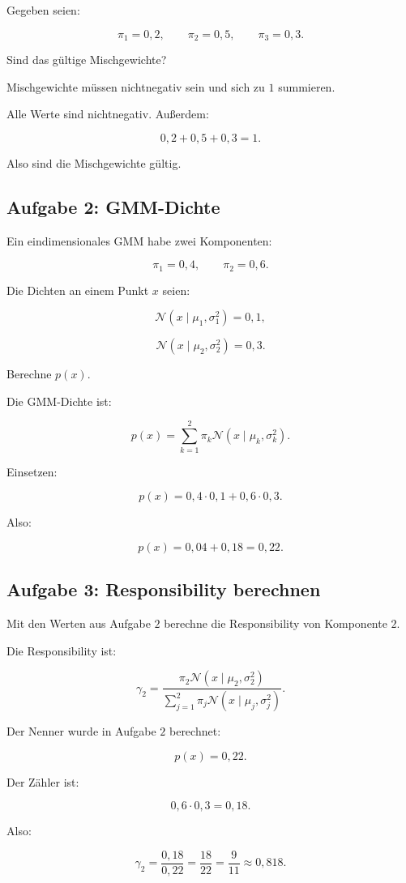 Gegeben seien:

\[
    \pi_1=0{,}2,
    \qquad
    \pi_2=0{,}5,
    \qquad
    \pi_3=0{,}3.
\]

Sind das gültige Mischgewichte?

\begin{examplebox}
Mischgewichte müssen nichtnegativ sein und sich zu \(1\) summieren.

Alle Werte sind nichtnegativ.
Außerdem:

\[
    0{,}2+0{,}5+0{,}3=1.
\]

Also sind die Mischgewichte gültig.
\end{examplebox}

\subsection{Aufgabe 2: GMM-Dichte}

Ein eindimensionales GMM habe zwei Komponenten:

\[
    \pi_1=0{,}4,
    \qquad
    \pi_2=0{,}6.
\]

Die Dichten an einem Punkt \(x\) seien:

\[
    \mathcal{N}(x\mid\mu_1,\sigma_1^2)=0{,}1,
\]

\[
    \mathcal{N}(x\mid\mu_2,\sigma_2^2)=0{,}3.
\]

Berechne \(p(x)\).

\begin{examplebox}
Die GMM-Dichte ist:

\[
    p(x)
    =
    \sum_{k=1}^{2}
    \pi_k
    \mathcal{N}(x\mid\mu_k,\sigma_k^2).
\]

Einsetzen:

\[
    p(x)
    =
    0{,}4\cdot 0{,}1
    +
    0{,}6\cdot 0{,}3.
\]

Also:

\[
    p(x)
    =
    0{,}04+0{,}18
    =
    0{,}22.
\]
\end{examplebox}

\subsection{Aufgabe 3: Responsibility berechnen}

Mit den Werten aus Aufgabe \(2\) berechne die Responsibility von Komponente \(2\).

\begin{examplebox}
Die Responsibility ist:

\[
    \gamma_2
    =
    \frac{
        \pi_2
        \mathcal{N}(x\mid\mu_2,\sigma_2^2)
    }{
        \sum_{j=1}^{2}
        \pi_j
        \mathcal{N}(x\mid\mu_j,\sigma_j^2)
    }.
\]

Der Nenner wurde in Aufgabe \(2\) berechnet:

\[
    p(x)=0{,}22.
\]

Der Zähler ist:

\[
    0{,}6\cdot 0{,}3=0{,}18.
\]

Also:

\[
    \gamma_2
    =
    \frac{0{,}18}{0{,}22}
    =
    \frac{18}{22}
    =
    \frac{9}{11}
    \approx
    0{,}818.
\]
\end{examplebox}

